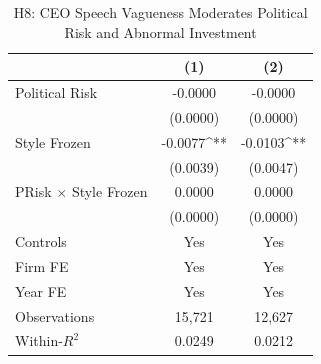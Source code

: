 \begin{table}[htbp]
\centering
\caption{H8: CEO Speech Vagueness Moderates Political Risk and Abnormal Investment}
\label{tab:h8_political_risk}
\small
\begin{tabular}{lcc}
\toprule
 & (1) & (2) \\
\midrule
Political Risk & -0.0000 & -0.0000 \\
 & (0.0000) & (0.0000) \\
Style Frozen & -0.0077^{**} & -0.0103^{**} \\
 & (0.0039) & (0.0047) \\
PRisk $\times$ Style Frozen & 0.0000 & 0.0000 \\
 & (0.0000) & (0.0000) \\
\midrule
Controls & Yes & Yes \\
Firm FE  & Yes & Yes \\
Year FE  & Yes & Yes \\
\midrule
Observations & 15,721 & 12,627 \\
Within-$R^2$ & 0.0249 & 0.0212 \\
\bottomrule
\end{tabular}
\end{table}